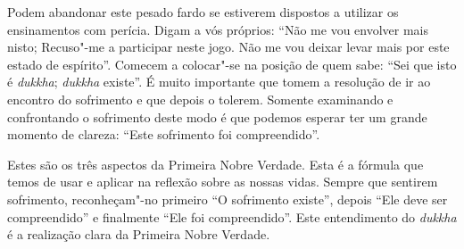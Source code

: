 Podem abandonar este pesado fardo se estiverem dispostos a utilizar os
ensinamentos com perícia. Digam a vós próprios: “Não me vou envolver mais nisto;
Recuso"-me a participar neste jogo. Não me vou deixar levar mais por este estado
de espírito”. Comecem a colocar"-se na posição de quem sabe: “Sei que isto é
\emph{dukkha}; \emph{dukkha} existe”. É muito importante que tomem a resolução
de ir ao encontro do sofrimento e que depois o tolerem. Somente examinando e
confrontando o sofrimento deste modo é que podemos esperar ter um grande momento
de clareza: “Este sofrimento foi compreendido”.

Estes são os três aspectos da Primeira Nobre Verdade. Esta é a fórmula que temos
de usar e aplicar na reflexão sobre as nossas vidas. Sempre que sentirem
sofrimento, reconheçam"-no primeiro “O sofrimento existe”, depois “Ele deve ser
compreendido” e finalmente “Ele foi compreendido”. Este entendimento do
\emph{dukkha} é a realização clara da Primeira Nobre Verdade.

